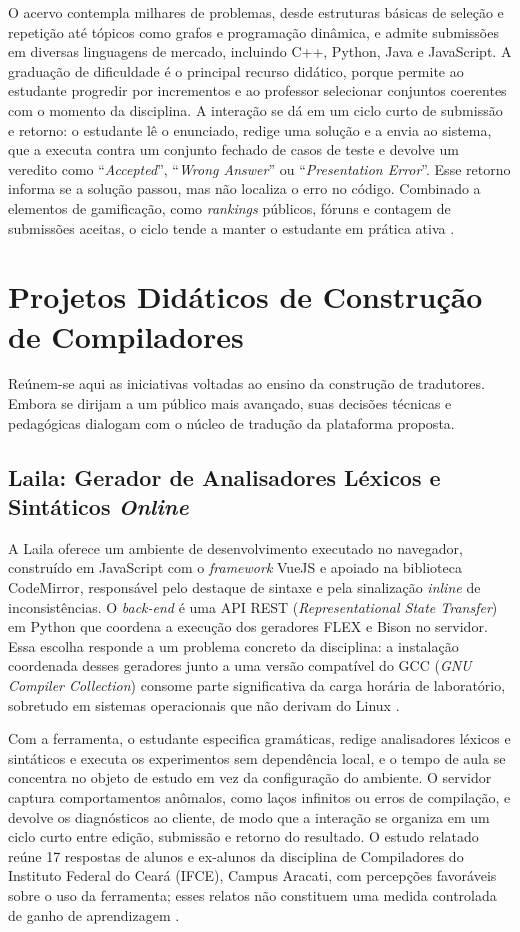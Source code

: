 O acervo contempla milhares de problemas, desde estruturas básicas de seleção e repetição até tópicos como grafos e programação dinâmica, e admite submissões em diversas linguagens de mercado, incluindo C++, Python, Java e JavaScript. A graduação de dificuldade é o principal recurso didático, porque permite ao estudante progredir por incrementos e ao professor selecionar conjuntos coerentes com o momento da disciplina. A interação se dá em um ciclo curto de submissão e retorno: o estudante lê o enunciado, redige uma solução e a envia ao sistema, que a executa contra um conjunto fechado de casos de teste e devolve um veredito como ``\textit{Accepted}'', ``\textit{Wrong Answer}'' ou ``\textit{Presentation Error}''. Esse retorno informa se a solução passou, mas não localiza o erro no código. Combinado a elementos de gamificação, como \textit{rankings} públicos, fóruns e contagem de submissões aceitas, o ciclo tende a manter o estudante em prática ativa \cite{beecrowd2026faq}.

\section{Projetos Didáticos de Construção de Compiladores}

Reúnem-se aqui as iniciativas voltadas ao ensino da construção de tradutores. Embora se dirijam a um público mais avançado, suas decisões técnicas e pedagógicas dialogam com o núcleo de tradução da plataforma proposta.

\subsection{Laila: Gerador de Analisadores Léxicos e Sintáticos \textit{Online}}

A Laila oferece um ambiente de desenvolvimento executado no navegador, construído em JavaScript com o \textit{framework} VueJS e apoiado na biblioteca CodeMirror, responsável pelo destaque de sintaxe e pela sinalização \textit{inline} de inconsistências. O \textit{back-end} é uma API REST (\textit{Representational State Transfer}) em Python que coordena a execução dos geradores FLEX e Bison no servidor. Essa escolha responde a um problema concreto da disciplina: a instalação coordenada desses geradores junto a uma versão compatível do GCC (\textit{GNU Compiler Collection}) consome parte significativa da carga horária de laboratório, sobretudo em sistemas operacionais que não derivam do Linux \cite{ladgelson2021}.

Com a ferramenta, o estudante especifica gramáticas, redige analisadores léxicos e sintáticos e executa os experimentos sem dependência local, e o tempo de aula se concentra no objeto de estudo em vez da configuração do ambiente. O servidor captura comportamentos anômalos, como laços infinitos ou erros de compilação, e devolve os diagnósticos ao cliente, de modo que a interação se organiza em um ciclo curto entre edição, submissão e retorno do resultado. O estudo relatado reúne 17 respostas de alunos e ex-alunos da disciplina de Compiladores do Instituto Federal do Ceará (IFCE), Campus Aracati, com percepções favoráveis sobre o uso da ferramenta; esses relatos não constituem uma medida controlada de ganho de aprendizagem \cite{ladgelson2021}.

